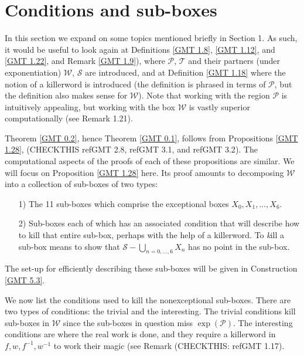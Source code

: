  
\chapter{Conditions and sub-boxes}
  
In this section we expand on some topics mentioned briefly in Section 1.  As such, it would be useful to look again at
Definitions \ref{GMT 1.8}, \ref{GMT 1.12}, and \ref{GMT 1.22}, and Remark \ref{GMT 1.9}),
where ${\mathcal P}$, ${\mathcal T}$ and their partners (under exponentiation)
${\mathcal W}$, ${\mathcal S}$ are introduced, and at
Definition \ref{GMT 1.18}
 where the notion of a killerword is introduced (the
definition is phrased in terms of ${\mathcal P}$, but the definition also makes sense for ${\mathcal W}$).  Note that working with
the region
${\mathcal P}$ is intuitively appealing, but working with the box ${\mathcal W}$ is vastly superior computationally (see Remark
1.21).

Theorem \ref{GMT 0.2},
hence
Theorem \ref{GMT 0.1}, follows from
Propositions \ref{GMT 1.28}, (CHECKTHIS ref{GMT 2.8}, ref{GMT 3.1}, and ref{GMT 3.2}).
  The computational aspects of the proofs of each of these propositions are similar.  We will focus on
Proposition \ref{GMT 1.28}
 here.
Its proof   amounts to decomposing 
 ${\mathcal W}$ into a collection of sub-boxes of two types:
\begin{itemize}
\item[1)]   The 11 sub-boxes which comprise the 
exceptional boxes $X_0, X_1, \ldots, X_6.$ 

\item[2)]   Sub-boxes each of which has an associated {\textit condition} that will describe how to kill that entire sub-box,
perhaps with the help of a killerword.  To {\textit kill} a sub-box means to show that 
${\mathcal S} - \bigcup_{n = 0,\dots, 6} X_n$ has no point in the sub-box. 
\end{itemize}
\noindent The set-up for efficiently describing these sub-boxes will be given in Construction \ref{GMT 5.3}. 
 

We now list the conditions used to kill the nonexceptional sub-boxes.  There are two types of conditions: the trivial and
the interesting.  The trivial conditions kill sub-boxes in ${\mathcal W}$ since the sub-boxes in question miss 
$\exp({\mathcal P}).$  The interesting conditions are where the real work is done, and they require a killerword in $f, w,
f^{-1}, w^{-1}$ to work their magic (see
Remark (CHECKTHIS: ref{GMT 1.17}).

